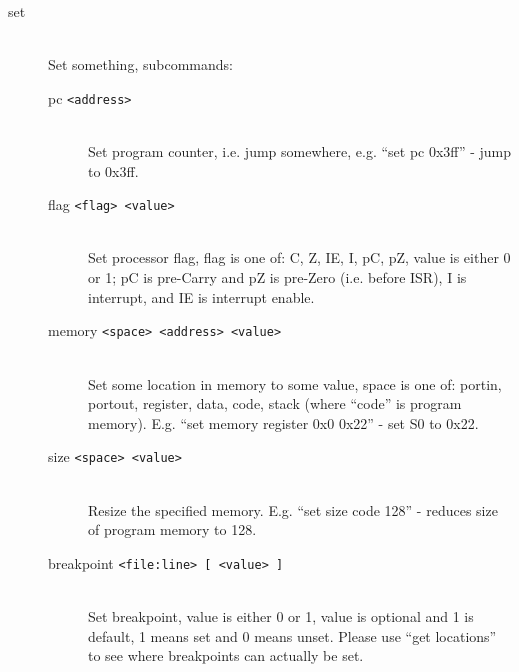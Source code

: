         \begin{description}
            \item[set]~\\
                Set something, subcommands:
                \begin{description}
                    \item[pc \texttt{<address>}]~\\
                        Set program counter, i.e. jump somewhere, e.g. ``set pc 0x3ff'' - jump to 0x3ff.
                    \item[flag \texttt{<flag> <value>}]~\\
                        Set processor flag, flag is one of: {C, Z, IE, I, pC, pZ}, value is either 0 or 1; pC is pre-Carry and pZ is pre-Zero (i.e. before ISR), I is interrupt, and IE is interrupt enable.
                    \item[memory \texttt{<space> <address> <value>}]~\\
                        Set some location in memory to some value, space is one of: { portin, portout, register, data, code, stack} (where ``code'' is program memory). E.g. ``set memory register 0x0 0x22'' - set S0 to 0x22.
                    \item[size \texttt{<space> <value>}]~\\
                        Resize the specified memory. E.g. ``set size code 128'' - reduces size of program memory to 128.
                    \item[breakpoint \texttt{<file:line> {[} <value> {]}}]~\\
                        Set breakpoint, value is either 0 or 1, value is optional and 1 is default, 1 means set and 0 means unset. Please use ``get locations'' to see where breakpoints can actually be set.
                \end{description}


\end{description}

